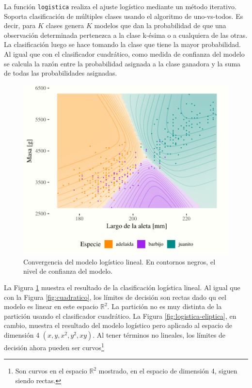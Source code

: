 \documentclass[]{tufte-handout}
\begin{document}
La función \texttt{logistica} realiza el ajuste logístico mediante un método iterativo. Soporta clasificación de múltiples clases usando el algoritmo de uno-vs-todos. Es decir, para \(K\) clases genera \(K\) modelos que dan la probabilidad de que una observación determinada pertenezca a la clase k-ésima o a cualquiera de las otras. La clasificación luego se hace tomando la clase que tiene la mayor probabilidad. Al igual que con el clasificador cuadrático, como medida de confianza del modelo se calcula la razón entre la probabilidad asignada a la clase ganadora y la suma de todas las probabilidades asignadas.

\begin{figure}
\includegraphics{TP-Labo-2_files/figure-latex/logistica-lineal-2} \caption[Convergencia del modelo logístico lineal]{Convergencia del modelo logístico lineal. En contornos negros, el nivel de confianza del modelo.}\label{fig:logistica-lineal}
\end{figure}

La Figura \ref{fig:logistica-lineal} muestra el resultado de la clasificación logística lineal. Al igual que con la Figura \ref{fig:cuadratico}, los límites de decisión son rectas dado qu eel modelo es linear en este espacio \(\mathbb{R}^2\). La partición no es muy distinta de la partición usando el clasificador cuadrático. La Figura \ref{fig:logistica-eliptica}, en cambio, muestra el resultado del modelo logístico pero aplicado al espacio de dimensión 4 \((x, y, x^2, y^2, xy)\). Al tener términos no lineales, los límites de decisión ahora pueden ser curvos\footnote{Son curvos en el espacio \(\mathbb{R}^2\) mostrado, en el espacio de dimensión 4, siguen siendo rectas.}
\end{document}
